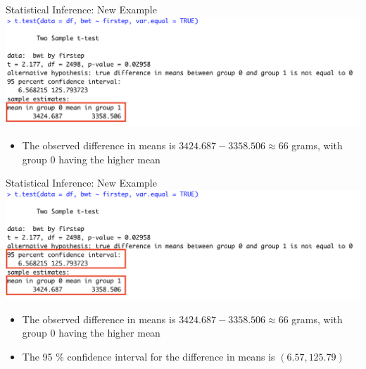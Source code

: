 \documentclass[
  ignorenonframetext,
]{beamer}
\providecommand{\tightlist}{%
  \setlength{\itemsep}{0pt}\setlength{\parskip}{0pt}}
\begin{document}
\begin{frame}{Statistical Inference: New Example}
\protect\hypertarget{statistical-inference-new-example-8}{}
\includegraphics{ttest2.png}

\begin{itemize}
\tightlist
\item
  The observed difference in means is \(3424.687- 3358.506 \approx 66\)
  grams, with group \(0\) having the higher mean
\end{itemize}
\end{frame}

\begin{frame}{Statistical Inference: New Example}
\protect\hypertarget{statistical-inference-new-example-9}{}
\includegraphics{ttest3.png}

\begin{itemize}
\tightlist
\item
  The observed difference in means is \(3424.687- 3358.506 \approx 66\)
  grams, with group \(0\) having the higher mean
\item
  The 95 \% confidence interval for the difference in means is
  \((6.57, 125.79)\)
\end{itemize}
\end{frame}
\end{document}
